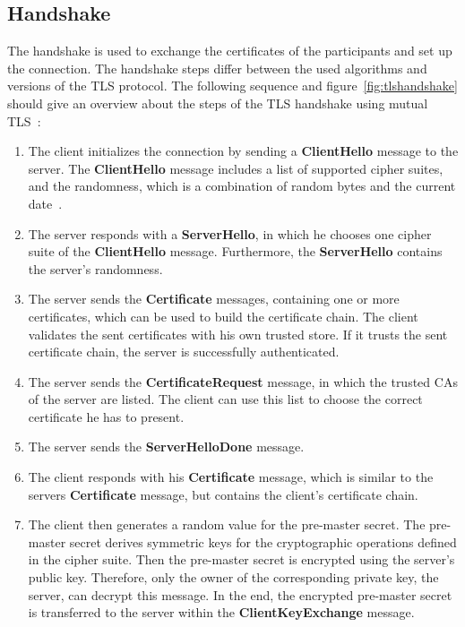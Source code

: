 \subsection{Handshake}
\label{sec:tlshandshake_details}
The handshake is used to exchange the certificates of the participants and set up the connection.
The handshake steps differ between the used algorithms and versions of the TLS protocol.
The following sequence and figure~\ref{fig:tlshandshake} should give an overview about the steps of the TLS handshake using mutual TLS~\cite{parsovs2013practical}:
\begin{enumerate}
	\item The client initializes the connection by sending a \textbf{ClientHello} message to the server.
		The \textbf{ClientHello} message includes a list of supported cipher suites, and the randomness, which is a combination of random bytes and the current date~\cite{mediumtls}.
	\item The server responds with a \textbf{ServerHello}, in which he chooses one cipher suite of the \textbf{ClientHello} message.
		Furthermore, the \textbf{ServerHello} contains the server's randomness.
	\item The server sends the \textbf{Certificate} messages, containing one or more certificates, which can be used to build the certificate chain.
		The client validates the sent certificates with his own trusted store.
		If it trusts the sent certificate chain, the server is successfully authenticated.
	\item The server sends the \textbf{CertificateRequest} message, in which the trusted CAs of the server are listed.
		The client can use this list to choose the correct certificate he has to present.
	\item The server sends the \textbf{ServerHelloDone} message.
	\item The client responds with his \textbf{Certificate} message, which is similar to the servers \textbf{Certificate} message, but contains the client's certificate chain.
	\item The client then generates a random value for the pre-master secret.
		The pre-master secret derives symmetric keys for the cryptographic operations defined in the cipher suite.
		Then the pre-master secret is encrypted using the server's public key.
		Therefore, only the owner of the corresponding private key, the server, can decrypt this message.
		In the end, the encrypted pre-master secret is transferred to the server within the \textbf{ClientKeyExchange} message.

\end{enumerate}
